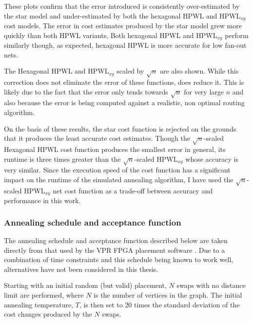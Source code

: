 				These plots confirm that the error introduced is consistently
				over-estimated by the star model and under-estimated by both the
				hexagonal HPWL and HPWL${_{xy}}$ cost models. The error in cost
				estimates produced by the star model grew more quickly than both HPWL
				variants, Both hexagonal HPWL and HPWL$_{xy}$ perform similarly though,
				as expected, hexagonal HPWL is more accurate for low fan-out nets.
				
				The Hexagonal HPWL and HPWL$_{xy}$ scaled by $\sqrt{n}$ are also shown.
				While this correction does not eliminate the error of these functions,
				does reduce it. This is likely due to the fact that the error only
				tends towards $\sqrt{n}$ for very large $n$ \cite{chung79} and also
				because the error is being computed against a realistic, non optimal
				routing algorithm.
				
				On the basis of these results, the star cost function is rejected on
				the grounds that it produces the least accurate cost estimates. Though
				the $\sqrt{n}$-scaled Hexagonal HPWL cost function produces the
				smallest error in general, its runtime is three times greater than the
				$\sqrt{n}$-scaled HPWL$_{xy}$ whose accuracy is very similar. Since the
				execution speed of the cost function has a significant impact on the
				runtime of the simulated annealing algorithm, I have used the
				$\sqrt{n}$-scaled HPWL$_{xy}$ net cost function as a trade-off between
				accuracy and performance in this work.
				
			\subsubsection{Annealing schedule and acceptance function}
				
				\label{sec:placement-schedule-acceptance}
				
				The annealing schedule and acceptance function described below are
				taken directly from that used by the VPR FPGA placement software
				\cite{betz97}. Due to a combination of time constraints and this
				schedule being known to work well, alternatives have not been
				considered in this thesis.
				
				Starting with an initial random (but valid) placement, $N$ swaps with no
				distance limit are performed, where $N$ is the number of vertices in the
				graph. The initial annealing temperature, $T$, is then set to 20 times
				the standard deviation of the cost changes produced by the $N$ swaps.
				
